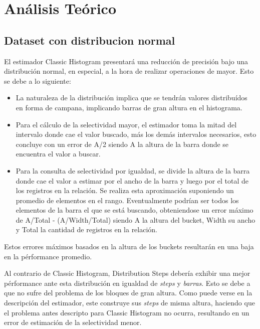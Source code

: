 \documentclass[a4paper, 10pt, twoside]{article}
\begin{document}


\section{Análisis Teórico}

\subsection{Dataset con distribucion normal}
El estimador Classic Histogram presentará una reducción de precisión bajo una distribución normal, en especial, a la hora de realizar operaciones de mayor. Esto se debe a lo siguiente:

\begin{itemize}
\item La naturaleza de la distribución implica que se tendrán valores distribuídos en forma de campana, implicando barras de gran altura en el histograma.
\item Para el cálculo de la selectividad mayor, el estimador toma la mitad del intervalo donde cae el valor buscado, más los demás intervalos necesarios, esto concluye con un error de A/2 siendo A la altura de la barra donde se encuentra el valor a buscar.
\item Para la consulta de selectividad por igualdad, se divide la altura de la barra donde cae el valor a estimar por el ancho de la barra y luego por el total de los registros en la relación. Se realiza esta aproximación suponiendo un promedio de elementos en el rango. Eventualmente podrían ser todos los elementos de la barra el que se está buscando, obteniendose un error máximo de A/Total - (A/Width/Total) siendo A la altura del bucket, Width su ancho y Total la cantidad de registros en la relación.
\end{itemize}

Estos errores máximos basados en la altura de los buckets resultarán en una baja en la pérformance promedio.

Al contrario de Classic Histogram, Distribution Steps debería exhibir una mejor pérformance ante esta distribución en igualdad de \textit{steps} y \textit{barras}. Esto se debe a que no sufre del problema de los bloques de gran altura. Como puede verse en la descripción del estimador, este construye sus \textit{steps} de misma altura, haciendo que el problema antes descripto para Classic Histogram no ocurra, resultando en un error de estimación de la selectividad menor.
\end{document}
